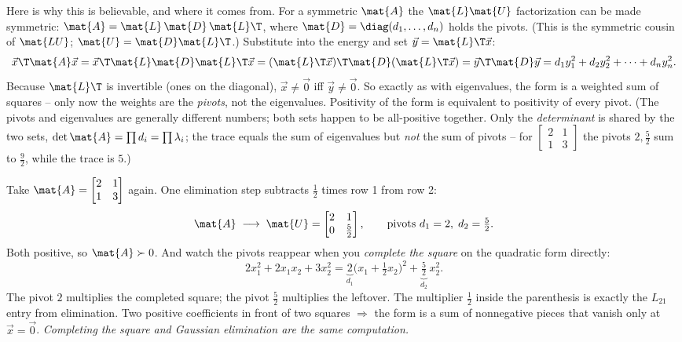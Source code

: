Here is why this is believable, and where it comes from. For a symmetric $\mat{A}$ the
$\mat{L}\mat{U}$ factorization can be made symmetric: $\mat{A} = \mat{L}\,\mat{D}\,\mat{L}\T$, where
$\mat{D} = \diag(d_1,\dots,d_n)$ holds the pivots. (This is the symmetric cousin of $\mat{LU}$;
$\mat{U} = \mat{D}\mat{L}\T$.) Substitute into the energy and set $\vec{y} = \mat{L}\T\vec{x}$:
\[
  \vec{x}\T\mat{A}\vec{x}
  = \vec{x}\T\mat{L}\mat{D}\mat{L}\T\vec{x}
  = (\mat{L}\T\vec{x})\T \mat{D} (\mat{L}\T\vec{x})
  = \vec{y}\T\mat{D}\vec{y}
  = d_1 y_1^2 + d_2 y_2^2 + \cdots + d_n y_n^2.
\]
Because $\mat{L}\T$ is invertible (ones on the diagonal), $\vec{x}\neq\vec{0}$ iff
$\vec{y}\neq\vec{0}$. So exactly as with eigenvalues, the form is a weighted sum of squares -- only
now the weights are the \emph{pivots}, not the eigenvalues. Positivity of the form is equivalent to
positivity of every pivot. (The pivots and eigenvalues are generally different numbers; both sets
happen to be all-positive together. Only the \emph{determinant} is shared by the two sets,
$\det\mat{A} = \prod d_i = \prod \lambda_i$; the trace equals the sum of eigenvalues but \emph{not}
the sum of pivots -- for $\begin{bmatrix}2&1\\1&3\end{bmatrix}$ the pivots $2,\tfrac52$ sum to
$\tfrac92$, while the trace is $5$.)

\begin{example}
\label{ch27:ex-square}
Take $\mat{A} = \begin{bmatrix} 2 & 1 \\ 1 & 3 \end{bmatrix}$ again. One elimination step subtracts
$\tfrac12$ times row 1 from row 2:
\[
  \mat{A} \;\longrightarrow\;
  \mat{U} = \begin{bmatrix} 2 & 1 \\ 0 & \tfrac52 \end{bmatrix},
  \qquad \text{pivots } d_1 = 2,\; d_2 = \tfrac52.
\]
Both positive, so $\mat{A}\succ 0$. And watch the pivots reappear when you \emph{complete the
square} on the quadratic form directly:
\[
  2x_1^2 + 2x_1 x_2 + 3x_2^2
  = \underbrace{2}_{d_1}\Big(x_1 + \tfrac12 x_2\Big)^2 + \underbrace{\tfrac52}_{d_2}\, x_2^2 .
\]
The pivot $2$ multiplies the completed square; the pivot $\tfrac52$ multiplies the leftover. The
multiplier $\tfrac12$ inside the parenthesis is exactly the $L_{21}$ entry from elimination. Two
positive coefficients in front of two squares $\Rightarrow$ the form is a sum of nonnegative pieces
that vanish only at $\vec{x}=\vec{0}$. \emph{Completing the square and Gaussian elimination are the
same computation.}
\end{example}

